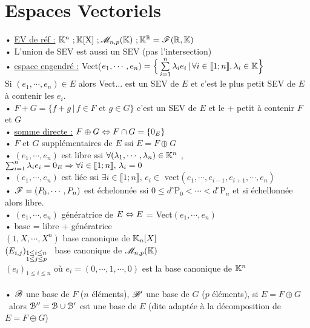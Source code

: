 \documentclass[12 pt]{exampleclass}
\begin{document}
\section{Espaces Vectoriels}

\begin{flushleft}
\begin{doublespace}

	• \underline{EV de réf :} $\mathbb{K}^n \ ; \mathbb{K}[\text{X}] \ ; \mathscr{M}_{n,p}(\mathbb{K}) \ ;\mathbb{K}^{\mathbb{R}} = \mathscr{F}(\mathbb{R}, \mathbb{K})$\\
	• L'union de SEV est aussi un SEV (pas l'intersection)\\
	• \underline{espace engendré :} Vect($e_1,\cdots, e_n) = \Big\{ \sum\limits_{i =1}^n \lambda_i e_i \, | \, \forall i\in \llbracket1;n\rrbracket , \lambda_i \in \mathbb{K} \Big\}$\\
	Si $(e_1,\cdots,e_n)\in E$ alors Vect... est un SEV de $E$ et c'est le plus petit SEV de $E$ à contenir les $e_i$.\\
	• $F + G =\{ f+g \, | \, f\in F$ et $g \in G \}$ \quad c'est un SEV de $E$ et le + petit à contenir $F$ et $G$\\
	• \underline{somme directe :} $F\oplus G \Leftrightarrow F\cap G =\{ 0_E\}$\\
	• $F$ et $G$ supplémentaires de $E$ ssi $E = F\oplus G$\\
	• $(e_1, \cdots, e_n)$ est libre ssi $\forall (\lambda_1,\cdots , \lambda_n) \in \mathbb{K}^n$ , $\sum_{i = 1}^n \lambda_i e_i = 0_E \Rightarrow \forall i\in \llbracket 1;n \rrbracket, \, \lambda_i = 0$\\
	• $(e_1,\cdots , e_n)$ est liée ssi $\exists i \in \llbracket 1;n \rrbracket , \, e_i\in$ vect$(e_1,\cdots , e_{i-1}, e_{i+1}, \cdots , e_n)$\\
	• $\mathscr{F} = (P_0,\cdots , P_n)$ est échelonnée ssi $0\leq d^\circ \text{P}_0 < \cdots < d^\circ \text{P}_n$ et si échellonnée alors libre.\\
	• $(e_1,\cdots , e_n)$ génératrice de $E \Leftrightarrow E$ = Vect$(e_1,\cdots ,e_n)$\\
	• base = libre + génératrice\\
	\qquad $(1,X, \cdots, X^n )$ base canonique de $\mathbb{K}_n[X]$\\
	\qquad $(E_{i,j} )_{\begin{subarray}{l}1\leq i \leq n\\ 1\leq j \leq p \end{subarray}}$ \, base canonique de $\mathscr{M}_{n,p}(\mathbb{K})$\\
	\qquad $(e_i)_{1\leq i \leq n}$ où $e_i=(0, \cdots , 1, \cdots , 0)$ est la base canonique de $\mathbb{K}^n$\\
	
	\text{ }\\
	• $\mathscr{B}$ une base de $F$ ($n$ éléments), $\mathscr{B}'$ une base de $G$ ($p$ éléments), si $E = F\oplus G$\\
	\ alors $\mathcal{B}'' = \mathcal{B} \cup \mathcal{B}'$ est une base de $E$ (dite adaptée à la décomposition de $E = F\oplus G$)\\

\end{doublespace}
\end{flushleft}
\end{document}
